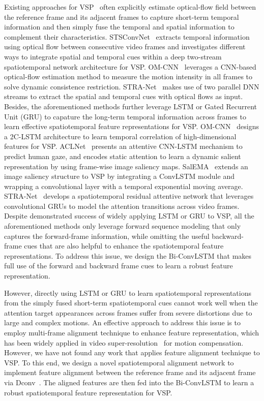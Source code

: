 \documentclass[review]{elsarticle}
\begin{document}
Existing approaches for VSP~\cite{bak2017spatio,jiang2017predicting,lai2019video,lai2019video} often explicitly estimate optical-flow field between the reference frame and its adjacent frames to capture short-term temporal information and then simply fuse the temporal and spatial information to complement their characteristics.
STSConvNet~\cite{bak2017spatio} extracts temporal information using optical flow between consecutive video frames and investigates different ways to integrate spatial and temporal cues within a deep two-stream spatiotemporal network architecture for VSP.
OM-CNN~\cite{jiang2017predicting} leverages a CNN-based optical-flow estimation method to measure the motion intensity in all frames to solve dynamic consistence restriction.
STRA-Net~\cite{lai2019video} makes use of two parallel DNN streams to extract the spatial and temporal cues with optical flows as input.
Besides, the aforementioned methods further leverage LSTM or Gated Recurrent Unit (GRU) to capature the long-term temporal information across frames to learn effective spatiotemporal feature representations for VSP.
OM-CNN~\cite{jiang2017predicting} designs a 2C-LSTM architecture to learn temporal correlation of high-dimensional features for VSP.
ACLNet~\cite{wang2018revisiting} presents an attentive CNN-LSTM mechanism to predict human gaze, and encodes static attention to learn a dynamic salient representation by using frame-wise image saliency maps.
SalEMA~\cite{linardos2019simple} extends an image saliency structure to VSP by integrating a ConvLSTM module and wrapping a convolutional layer with a temporal exponential moving average.
STRA-Net~\cite{lai2019video} develops a spatiotemporal residual attentive network that leverages convolutional GRUs to model the attention transitions across video frames.
Despite demonstrated success of widely applying LSTM or GRU to VSP, all the aforementioned methods only leverage forward sequence modeling that only captures the forward-frame information, while omitting the useful backward-frame cues that are also helpful to enhance the spatiotemporal feature representations.
To address this issue, we design the Bi-ConvLSTM that makes full use of the forward and backward frame cues to learn a robust feature representation.


However, directly using LSTM or GRU to learn spatiotemporal representations from the simply fused short-term spatiotemporal cues cannot work well when the attention target appearances across frames suffer from severe distortions due to large and complex motions.
An effective approach to address this issue is to employ multi-frame alignment technique to enhance feature representation, which has been widely applied in video super-resolution~\cite{jo2018deep,tian2018tdan,wang2019edvr} for motion compensation.
However, we have not found any work that applies feature alignment technique to VSP.
To this end, we design a novel spatiotemporal alignment network to implement feature alignment between the reference frame and its adjacent frame via Dconv~\cite{zhu2019deformable}.
The aligned features are then fed into the Bi-ConvLSTM to learn a robust spatiotemporal feature representation for VSP.
\end{document}

